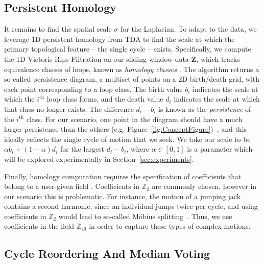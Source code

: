 \documentclass{article}
\newcommand{\mb}{\mathbf}
\begin{document}
\subsection{Persistent Homology}
\label{sec:tda}
It remains to find the spatial scale $\sigma$ for the Laplacian.
To adapt to the data, we leverage 1D persistent homology from TDA \cite{edelsbrunner2010computational} to find the scale at which the primary topological feature -- the single cycle -- exists.  Specifically, we compute the 1D Vietoris Rips Filtration on our sliding window data $\mb{Z}$, which tracks equivalence classes of loops, known as {\em homology classes} \cite{Hatcher}.  The algorithm returns a so-called persistence diagram, a multiset of points on a 2D birth/death grid, with each point corresponding to a loop class.  The birth value $b_i$ indicates the scale at which the $i^{\text{th}}$ loop class forms, and the death value $d_i$ indicates the scale at which that class no longer exists.  The difference $d_i - b_i$ is known as the {\em persistence} of the $i^{\text{th}}$ class.  For our scenario, one point in the diagram should have a much larger persistence than the others (e.g. Figure~\ref{fig:ConceptFigure})~\cite{perea2015sliding,tralie2017quasi}, and this ideally reflects the single cycle of motion that we seek.  We take our scale to be $\alpha b_i + (1-\alpha)d_i$ for the largest $d_i - b_i$, where $\alpha \in [0, 1]$ is a parameter which will be explored experimentally in Section~\ref{sec:experiments}.

Finally, homology computation requires the specification of coefficients that belong to a user-given field \cite{Hatcher,maria2014gudhi}. Coefficients in $\mathbb{Z}_2$ are commonly chosen, however in our scenario this is problematic. For instance, the motion of a jumping jack contains a second harmonic, since an individual jumps twice per cycle, and using coefficients in $\mathbb{Z}_2$ would lead to so-called M{\"o}bius splitting~\cite{perea2015sliding, tralie2017geometric, traliemoebius}. Thus, we use coefficients in the field $\mathbb{Z}_{49}$ in order to capture these types of complex motions.

\subsection{Cycle Reordering And Median Voting}
\label{sec:cyclereordering}
\end{document}
